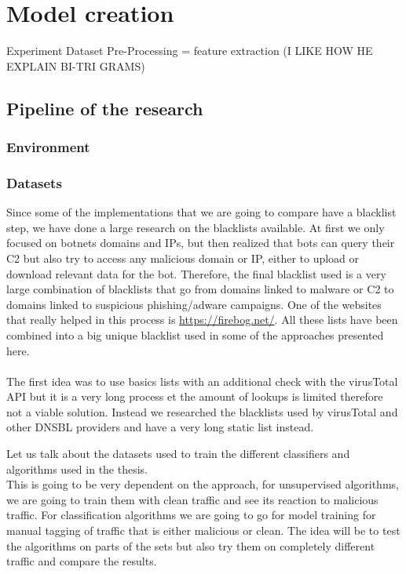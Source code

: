
\chapter{Model creation} %

\label{Model creation}
Experiment Dataset Pre-Processing = feature extraction (I LIKE HOW HE EXPLAIN BI-TRI GRAMS)
\section{Pipeline of the research}
\subsection{Environment}
\subsection{Datasets}

Since some of the implementations that we are going to compare have a blacklist step, we have done a large research on the blacklists available. At first we only focused on botnets domains and IPs, but then realized that bots can query their C2 but also try to access any malicious domain or IP, either to upload or download relevant data for the bot. Therefore, the final blacklist used is a very large combination of blacklists that go from domains linked to malware or C2 to domains linked to suspicious phishing/adware campaigns. One of the websites that really helped in this process is \url{https://firebog.net/}. All these lists have been combined into a big unique blacklist used in some of the approaches presented here.\\\\

The first idea was to use basics lists with an additional check with the virusTotal API but it is a very long process et the amount of lookups is limited therefore not a viable solution. Instead we researched the blacklists used by virusTotal and other DNSBL providers and have a very long static list instead.


Let us talk about the datasets used to train the different classifiers and algorithms used in the thesis.\\
This is going to be very dependent on the approach, for unsupervised algorithms, we are going to train them with clean traffic and see its reaction to malicious traffic. For classification algorithms we are going to go for model training for manual tagging of traffic that is either malicious or clean.
The idea will be to test the algorithms on parts of the sets but also try them on completely different traffic and compare the results.
\\

